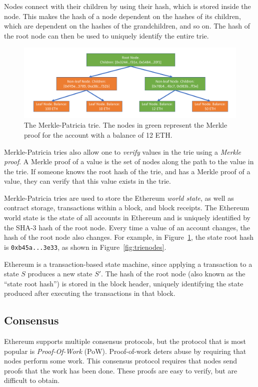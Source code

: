 \documentclass[12pt]{article}
\newcounter{protocol}
\begin{document}
Nodes connect with their children by using their hash, which is stored inside the node. This makes the hash of a node dependent on the hashes of its children, which are dependent on the hashes of the grandchildren, and so on. The hash of the root node can then be used to uniquely identify the entire trie.

\begin{figure}[H]
  \centering
  \includegraphics[width=\textwidth]{../figures/background/trie/tree_with_merkle_proof.pdf}
  \caption{The Merkle-Patricia trie. The nodes in green represent the Merkle proof for the account with a balance of 12 ETH.} \label{fig:trie}
\end{figure}

Merkle-Patricia tries also allow one to \emph{verify} values in the trie using a \emph{Merkle proof}. A Merkle proof of a value is the set of nodes along the path to the value in the trie. If someone knows the root hash of the trie, and has a Merkle proof of a value, they can verify that this value exists in the trie.


Merkle-Patricia tries are used to store the Ethereum \emph{world state}, as well as contract storage, transactions within a block, and block receipts. The Ethereum world state is the state of all accounts in Ethereum and is uniquely identified by the SHA-3 hash of the root node. Every time a value of an account changes, the hash of the root node also changes. For example, in Figure~\ref{fig:trie}, the state root hash is \texttt{0xb45a...3e33}, as shown in Figure~\ref{fig:trienodes}.

Ethereum is a transaction-based state machine, since applying a transaction to a state $S$ produces a new state $S'$. The hash of the root node (also known as the ``state root hash'') is stored in the block header, uniquely identifying the state produced after executing the transactions in that block.


\subsection{Consensus}
Ethereum supports multiple consensus protocols, but the protocol that is most popular is \emph{Proof-Of-Work} (PoW). Proof-of-work deters abuse by requiring that nodes perform some work. This consensus protocol requires that nodes send proofs that the work has been done. These proofs are easy to verify, but are difficult to obtain.
\end{document}
